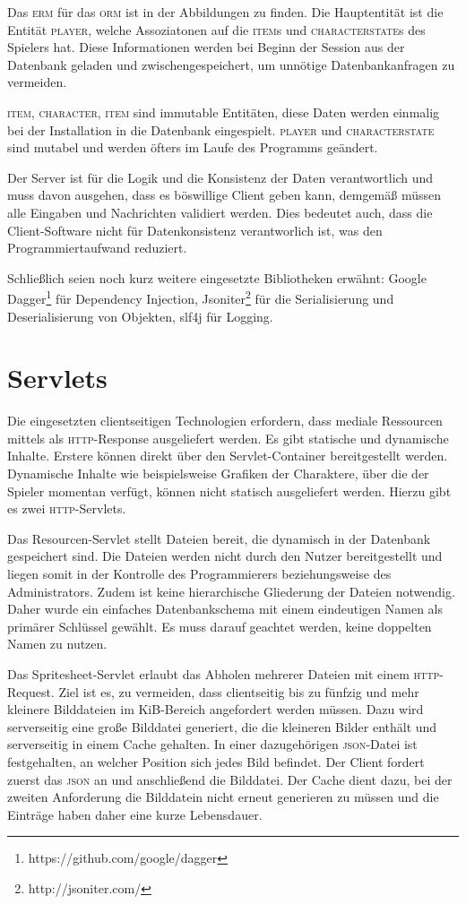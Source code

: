\documentclass[ngerman,11pt]{report}
\begin{document}
Das \textsc{erm} für das \textsc{orm} ist in der Abbildungen zu finden. Die Hauptentität
ist die Entität \textsc{player}, welche Assoziatonen auf die \textsc{item}s und
\textsc{characterstate}s des Spielers hat. Diese Informationen werden bei Beginn der
Session aus der Datenbank geladen und zwischengespeichert, um unnötige Datenbankanfragen
zu vermeiden.

\textsc{item}, \textsc{character}, \textsc{item} sind immutable Entitäten, diese Daten
werden einmalig bei der Installation in die Datenbank eingespielt. \textsc{player} und
\textsc{characterstate} sind mutabel und werden öfters im Laufe des Programms geändert.

Der Server ist für die Logik und die Konsistenz der Daten verantwortlich und muss davon
ausgehen, dass es böswillige Client geben kann, demgemäß müssen alle Eingaben und Nachrichten
validiert werden. Dies bedeutet auch, dass die Client-Software nicht für Datenkonsistenz
verantworlich ist, was den Programmiertaufwand reduziert.

Schließlich seien noch kurz weitere eingesetzte Bibliotheken erwähnt: Google
Dagger\footnote{https://github.com/google/dagger} für Dependency Injection,
Jsoniter\footnote{http://jsoniter.com/} für die Serialisierung und
Deserialisierung von Objekten, slf4j für Logging.

\section{Servlets}

Die eingesetzten clientseitigen Technologien erfordern, dass mediale Ressourcen mittels
als \textsc{http}-Response ausgeliefert werden. Es gibt statische und dynamische Inhalte.
Erstere können direkt über den Servlet-Container bereitgestellt werden. Dynamische Inhalte
wie beispielsweise Grafiken der Charaktere, über die der Spieler momentan verfügt, können
nicht statisch ausgeliefert werden. Hierzu gibt es zwei \textsc{http}-Servlets.

Das Resourcen-Servlet stellt Dateien bereit, die dynamisch in der Datenbank gespeichert sind.
Die Dateien werden nicht durch den Nutzer bereitgestellt und liegen somit in der Kontrolle des
Programmierers beziehungsweise des Administrators. Zudem ist keine hierarchische Gliederung
der Dateien notwendig. Daher wurde ein einfaches Datenbankschema mit einem eindeutigen Namen
als primärer Schlüssel gewählt. Es muss darauf geachtet werden, keine doppelten Namen zu nutzen.

Das Spritesheet-Servlet erlaubt das Abholen mehrerer Dateien mit einem \textsc{http}-Request.
Ziel ist es, zu vermeiden, dass clientseitig bis zu fünfzig und mehr kleinere Bilddateien im
KiB-Bereich angefordert werden müssen. Dazu wird serverseitig eine große Bilddatei generiert,
die die kleineren Bilder enthält und serverseitig in einem Cache gehalten.
In einer dazugehörigen \textsc{json}-Datei ist festgehalten, an welcher Position sich jedes Bild befindet. Der Client fordert zuerst das \textsc{json} an und anschließend die Bilddatei. Der Cache
dient dazu, bei der zweiten Anforderung die Bilddatein nicht erneut generieren zu müssen und die
Einträge haben daher eine kurze Lebensdauer.
\end{document}
